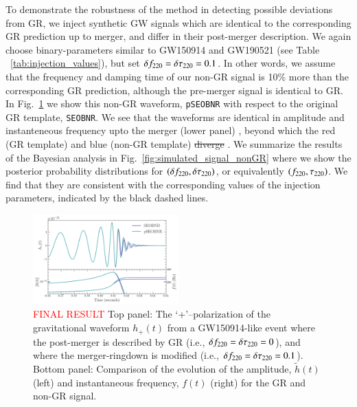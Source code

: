 To demonstrate the robustness of the method in detecting possible
deviations from GR, we inject synthetic GW signals which are identical to
the corresponding GR prediction up to merger, and differ in their post-merger
description. We again choose binary-parameters
similar to GW150914 and GW190521 (see Table ~\ref{tab:injection_values}), but
set $\delta f_{\text{220}} = \delta \tau_{\text{220}} = 0.1 $.
In other words, we assume that the frequency and damping time
of our non-GR signal is 10\% more than the corresponding GR prediction,
although the pre-merger signal is identical to GR. In Fig.~\ref{fig:nongr_waveform}
we show this non-GR waveform, \texttt{pSEOBNR} with respect to the 
original GR template, \texttt{SEOBNR}. We see that the waveforms are identical in amplitude
and instanteneous frequency upto the merger (lower panel) , beyond which the 
red (GR template) and blue (non-GR template) \sout{diverge} . We summarize the results of the Bayesian analysis in Fig.~\ref{fig:simulated_signal_nonGR} where we
show the posterior probability distributions for $(\delta f_{\text{220}}, \delta \tau_{\text{220}})$, or equivalently
$(f_{\text{220}}, \tau_{\text{220}})$. We find that they are consistent with the corresponding
values of the injection parameters, indicated by the black dashed lines.

\begin{figure}
        \includegraphics[width=0.5\textwidth]{figures/modGR_waveforms_amplitudephase.png}
        \caption{\textcolor{red}{FINAL RESULT} Top panel: The `+'--polarization of the gravitational waveform $h_+(t)$ from a GW150914-like event where the post-merger is described by GR (i.e., $\delta f_{\text{220}} = \delta \tau_{\text{220}} = 0$), and where the merger-ringdown is modified (i.e., $\delta f_{\text{220}} = \delta \tau_{\text{220}} = 0.1$). Bottom panel: Comparison of the evolution of the amplitude, $\tilde{h}(t)$ (left) and instantaneous frequency, $f(t)$ (right) for the GR and non-GR signal.}
        \label{fig:nongr_waveform}
\end{figure}

